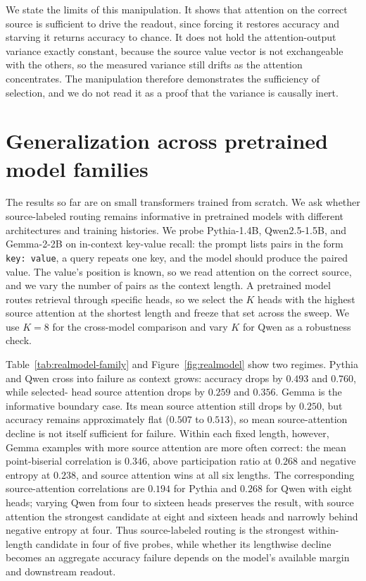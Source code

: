 \documentclass[letterpaper]{article} %
\begin{document}
We state the limits of this manipulation.
It shows that attention on the correct source is sufficient to drive the readout, since forcing it restores
accuracy and starving it returns accuracy to chance.
It does not hold the attention-output variance exactly constant, because the source value vector is not
exchangeable with the others, so the measured variance still drifts as the attention concentrates.
The manipulation therefore demonstrates the sufficiency of selection, and we do not read it as a proof that
the variance is causally inert.

\section{Generalization across pretrained model families}
\label{sec:realmodel}

The results so far are on small transformers trained from scratch.
We ask whether source-labeled routing remains informative in pretrained models with different architectures
and training histories.
We probe Pythia-1.4B, Qwen2.5-1.5B, and Gemma-2-2B on in-context key-value recall: the prompt lists pairs in
the form
\texttt{key: value}, a query repeats one key, and the model should produce the paired value.
The value's position is known, so we read attention on the correct source, and we vary the number of pairs
as the context length.
A pretrained model routes retrieval through specific heads, so we select the $K$ heads with the highest
source attention at the shortest length and freeze that set across the sweep.
We use $K=8$ for the cross-model comparison and vary $K$ for Qwen as a robustness check.

Table~\ref{tab:realmodel-family} and Figure~\ref{fig:realmodel} show two regimes.
Pythia and Qwen cross into failure as context grows: accuracy drops by $0.493$ and $0.760$, while selected-
head source attention drops by $0.259$ and $0.356$.
Gemma is the informative boundary case.
Its mean source attention still drops by $0.250$, but accuracy remains approximately flat
($0.507$ to $0.513$), so mean source-attention decline is not itself sufficient for failure.
Within each fixed length, however, Gemma examples with more source attention are more often correct: the
mean point-biserial correlation is $0.346$, above participation ratio at $0.268$ and negative entropy at
$0.238$, and source attention wins at all six lengths.
The corresponding source-attention correlations are $0.194$ for Pythia and $0.268$ for Qwen with eight
heads; varying Qwen from four to sixteen heads preserves the result, with source attention the strongest
candidate at eight and sixteen heads and narrowly behind negative entropy at four.
Thus source-labeled routing is the strongest within-length candidate in four of five probes, while whether
its lengthwise decline becomes an aggregate accuracy failure depends on the model's available margin and
downstream readout.
\end{document}
